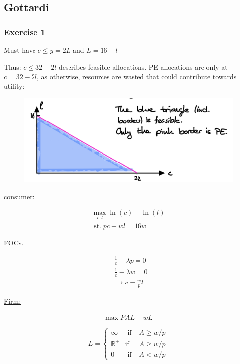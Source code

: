 {
\subsection*{Gottardi}

{
\subsubsection*{Exercise 1}

\begin{enumerate}[label=(\alph*)]
{\item 
Must have $c \leq y=2 L$ and $L=16-l$

Thus: $c \leqslant 32-2 l$ describes feasible allocations. PE allocations are only at $c=32-2 l$, as otherwise, resources are wasted that could contribute towards utility:

\begin{figure}[!htp]
    \centering
    \includegraphics[width=.75\textwidth]{images/2020_21_1.png}
\end{figure}
}
{\item 
\underline{consumer:}

\begin{align*}
    \max _{c, l} \ln (c)+\ln (l) \\
    \text { st. } p c+w l=16 w
\end{align*}

FOCs:

\begin{align*}
    & \frac{1}{c}-\lambda p=0 \\
    & \frac{1}{c}-\lambda w=0 \\
    &\rightarrow c=\frac{w}{p} l
\end{align*}

\underline{Firm:}

\begin{align*}
    \max P A L-w L
\end{align*}

$$
L=\left\{\begin{array}{lll}
\infty & \text { if } & A \geq w / p \\
\mathbb{R}^{+} & \text {if } & A \geq w / p \\
0 & \text { if } & A<w / p
\end{array}\right.
$$

}
\end{enumerate}}}
